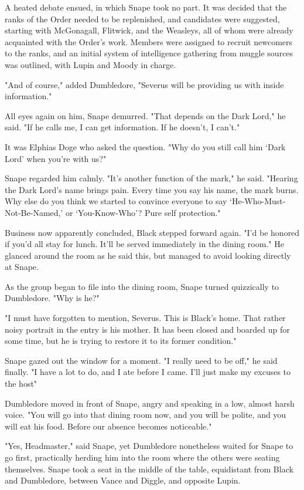 A heated debate ensued, in which Snape took no part. It was decided that the ranks of the Order needed to be replenished, and candidates were suggested, starting with McGonagall, Flitwick, and the Weasleys, all of whom were already acquainted with the Order's work. Members were assigned to recruit newcomers to the ranks, and an initial system of intelligence gathering from muggle sources was outlined, with Lupin and Moody in charge.

"And of course," added Dumbledore, "Severus will be providing us with inside information."

All eyes again on him, Snape demurred. "That depends on the Dark Lord," he said. "If he calls me, I can get information. If he doesn't, I can't."

It was Elphias Doge who asked the question. "Why do you still call him `Dark Lord' when you're with us?"

Snape regarded him calmly. "It's another function of the mark," he said. "Hearing the Dark Lord's name brings pain. Every time you say his name, the mark burns. Why else do you think we started to convince everyone to say `He-Who-Must-Not-Be-Named,' or `You-Know-Who'? Pure self protection."

Business now apparently concluded, Black stepped forward again. "I'd be honored if you'd all stay for lunch. It'll be served immediately in the dining room." He glanced around the room as he said this, but managed to avoid looking directly at Snape.

As the group began to file into the dining room, Snape turned quizzically to Dumbledore. "Why is he{\el}?"

"I must have forgotten to mention, Severus. This is Black's home. That rather noisy portrait in the entry is his mother. It has been closed and boarded up for some time, but he is trying to restore it to its former condition."

Snape gazed out the window for a moment. "I really need to be off," he said finally. "I have a lot to do, and I ate before I came. I'll just make my excuses to the host{\el}"

Dumbledore moved in front of Snape, angry and speaking in a low, almost harsh voice. "You will go into that dining room now, and you will be polite, and you will eat his food. Before our absence becomes noticeable."

"Yes, Headmaster," said Snape, yet Dumbledore nonetheless waited for Snape to go first, practically herding him into the room where the others were seating themselves. Snape took a seat in the middle of the table, equidistant from Black and Dumbledore, between Vance and Diggle, and opposite Lupin.

